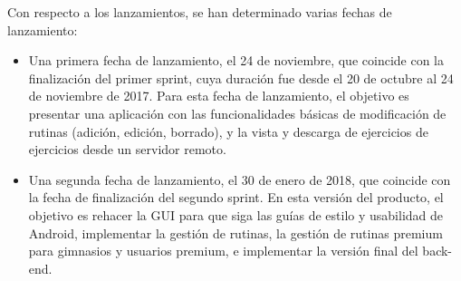 \documentclass[11pt,a4paper]{report}
\begin{document}
Con respecto a los lanzamientos, se han determinado varias fechas de lanzamiento:
\begin{itemize}
	\item Una primera fecha de lanzamiento, el 24 de noviembre, que coincide con la finalización del primer sprint, cuya duración fue desde el 20 de octubre al 24 de noviembre de 2017. Para esta fecha de lanzamiento, el objetivo es presentar una aplicación con las funcionalidades básicas de modificación de rutinas (adición, edición, borrado), y la  vista y descarga de ejercicios de ejercicios desde un servidor remoto.
	\item Una segunda fecha de lanzamiento, el 30 de enero de 2018,  que coincide con la fecha de finalización del segundo sprint. En esta versión del producto, el objetivo es rehacer la GUI para que siga las guías de estilo y usabilidad de Android, implementar la gestión de rutinas, la gestión de rutinas premium para gimnasios y usuarios premium, e implementar la versión final del back-end.
\end{itemize}
\end{document}
